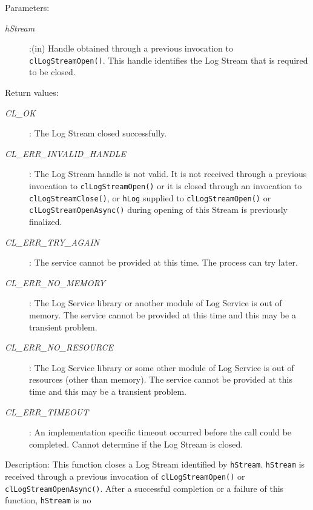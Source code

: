 \begin{flushleft}
\begin{Desc}
\begin{verbatim}
\end{verbatim}
\normalsize
\end{Desc}
\begin{Desc}
\item[Parameters:] \begin{description}
\item[{\em hStream}]:(in) Handle obtained through a previous invocation to {\tt{clLogStreamOpen()}}. This handle identifies the Log Stream that 
is required to be closed.
\end{description}
\end{Desc}
\begin{Desc}
\item[Return values:]
\begin{description}
\item[{\em CL\_\-OK}]: The Log Stream closed successfully.
\item[{\em CL\_\-ERR\_\-INVALID\_\-HANDLE}]: The Log Stream handle is not valid. It is not received through a previous invocation to 
{\tt{clLogStreamOpen()}} or it is closed through an invocation to {\tt{clLogStreamClose()}}, or {\tt{hLog}} supplied to {\tt{clLogStreamOpen()}} or 
{\tt{clLogStreamOpenAsync()}} during opening of this Stream is previously finalized.
\item[{\em CL\_\-ERR\_\-TRY\_\-AGAIN}]: The service cannot be provided at this time. The process can try later.
\item[{\em CL\_\-ERR\_\-NO\_\-MEMORY}]: The Log Service library or another module of Log Service is out of memory. The service cannot 
be provided at this time and this may be a transient problem.
\item[{\em CL\_\-ERR\_\-NO\_\-RESOURCE}]: The Log Service library or some other module of Log Service is out of resources 
(other than memory). The service cannot be provided at this time and this may be a transient problem.
\item[{\em CL\_\-ERR\_\-TIMEOUT}]: An implementation specific timeout occurred before the call could be completed. Cannot determine if
the Log Stream is closed.
\end{description}
\end{Desc}
\begin{Desc}
\item[Description:] This function closes a Log Stream identified by {\tt{hStream}}. {\tt{hStream}} is received through a previous invocation of  
{\tt{clLogStreamOpen()}} or {\tt{clLogStreamOpenAsync()}}. After a successful completion or a failure of this function, {\tt{hStream}} is no 

\end{Desc}
\end{flushleft}

